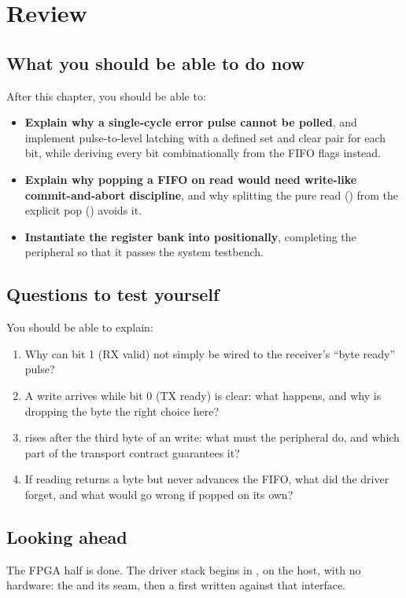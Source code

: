 
\section{Review}
\label{c5:sec:review}

\subsection*{What you should be able to do now}
After this chapter, you should be able to:
\begin{itemize}
  \item \textbf{Explain why a single-cycle error pulse cannot be polled}, and implement
    pulse-to-level latching with a defined set and clear pair for each  bit, while
    deriving every  bit combinationally from the FIFO flags instead.
  \item \textbf{Explain why popping a FIFO on read would need write-like commit-and-abort
    discipline}, and why splitting the pure read () from the explicit pop
    () avoids it.
  \item \textbf{Instantiate the register bank into  positionally}, completing the
    peripheral so that it passes the system testbench.
\end{itemize}

\subsection*{Questions to test yourself}
You should be able to explain:
\begin{enumerate}
  \item Why can  bit 1 (RX valid) not simply be wired to the receiver's ``byte ready''
    pulse?
  \item A  write arrives while  bit 0 (TX ready) is clear: what happens,
    and why is dropping the byte the right choice here?
  \item {} rises after the third byte of an  write: what must the peripheral do,
    and which part of the transport contract guarantees it?
  \item If reading  returns a byte but never advances the FIFO, what did the driver
    forget, and what would go wrong if  popped on its own?
\end{enumerate}

\subsection*{Looking ahead}
The FPGA half is done. The driver stack begins in , on the host, with no hardware: the
 and its  seam, then a first
 written against that interface.
